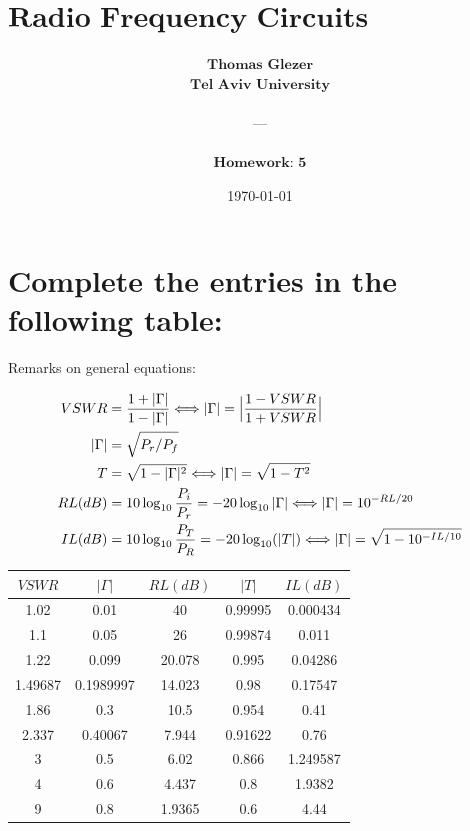 \documentclass[12pt, letterpaper]{article}
\title{
  \Large $\textbf{Radio Frequency Circuits \& Antenna}$
}
\author{
  $\textbf{Thomas Glezer}$\\
  $\textbf{Tel Aviv University}$\\\\
  ---\\\\
  $\textbf{Homework: 5}$\\
}
\date{\today}
\begin{document}
\begin{titlingpage}
  \maketitle
\end{titlingpage}

\pagebreak

\section{Complete the entries in the following table:}

\vspace{2em}
Remarks on general equations:
\vspace{2em}

\begin{align}
  VSWR
  &=
  {1+|\Gamma|\over1-|\Gamma|}
  \Longleftrightarrow
  |\Gamma|
  =
  \Big|{1-VSWR\over1+VSWR}\Big|
  \\
  |\Gamma|&=\sqrt{P_r/P_f}
  \\
  T&=\sqrt{1-|\Gamma|^2}
  \Longleftrightarrow
  |\Gamma|=\sqrt{1-T^2}
  \\
  RL(dB) &= 10\log_{10}{P_i\over P_r} = -20\log_{10}|\Gamma|
  \Longleftrightarrow
  |\Gamma|
  =
  10^{-RL/20}
  \\
  IL(dB) &= 10\log_{10}{P_T\over P_R}
  =
  -20\log_{10}(|T|)
  \Longleftrightarrow
  |\Gamma|
  =
  \sqrt{1-10^{-IL/10}}
\end{align}

\vspace{2em}

\begin{center}
  \begin{tabular}{| c | c | c | c | c |}
    \hline
    $VSWR$ & $|\Gamma|$ & $RL(dB)$ & $|T|$ & $IL (dB)$\\
    \hline
    {\color{blue}1.02} & 0.01 & {\color{blue}40} & {\color{blue}0.99995} & {\color{blue}0.000434} \\
    \hline
    {\color{blue}1.1} & {\color{blue}0.05} & 26 & {\color{blue}0.99874} & {\color{blue}0.011} \\
    \hline
    1.22 & {\color{blue}0.099} & {\color{blue}20.078} & {\color{blue}0.995} & {\color{blue}0.04286} \\
    \hline
    {\color{blue}1.49687} & {\color{blue}0.1989997} & {\color{blue}14.023} & 0.98 & {\color{blue}0.17547} \\
    \hline
    1.86 & 0.3 & 10.5 & 0.954 & 0.41 \\
    \hline
    {\color{blue}2.337}& {\color{blue}0.40067} & {\color{blue}7.944} & {\color{blue}0.91622} & 0.76 \\
    \hline
    {\color{blue}3}& {\color{blue}0.5} & 6.02 & {\color{blue}0.866} & {\color{blue}1.249587} \\
    \hline
    4 & {\color{blue}0.6} & {\color{blue}4.437} & {\color{blue}0.8} & {\color{blue}1.9382} \\
    \hline
    {\color{blue}9} & {\color{blue}0.8} & {\color{blue}1.9365} & {\color{blue}0.6} & 4.44 \\
    \hline
  \end{tabular}
\end{center}
\end{document}
